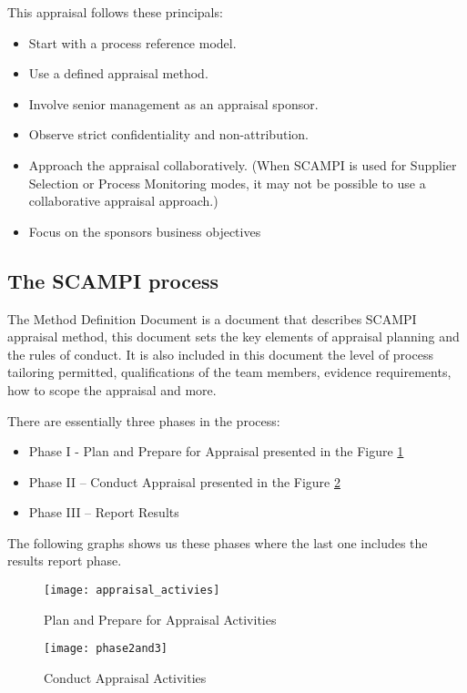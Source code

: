 This appraisal follows these principals:
\begin{itemize}
	\item Start with a process reference model.
	\item Use a defined appraisal method.
	\item Involve senior management as an appraisal sponsor.
	\item Observe strict confidentiality and non-attribution.
	\item Approach the appraisal collaboratively. (When SCAMPI is used for Supplier Selection or Process Monitoring modes, it may not be
	possible to use a collaborative appraisal approach.)
	\item Focus on the sponsors business objectives
\end{itemize}

\subsection{The SCAMPI process}

The Method Definition Document is a document that describes SCAMPI appraisal method, this document sets the key elements of appraisal planning and the rules of conduct. It is also included in this document the level of process tailoring permitted, qualifications of the team members, evidence requirements, how to scope the appraisal and more.

There are essentially three phases in the process:
\begin{itemize}
	\item Phase I - Plan and Prepare for Appraisal presented in the Figure \ref{fig:plan_appraisal}
	\item Phase II – Conduct Appraisal presented in the Figure \ref{fig:results_appraisal}
	\item Phase III – Report Results
\end{itemize}

The following graphs shows us these phases where the last one includes the results report phase.

\begin{figure}[h]
	\begin{center}
		\leavevmode
		\texttt{[image: appraisal\_activies]}
		\caption{Plan and Prepare for Appraisal Activities}
		\label{fig:plan_appraisal}
	\end{center}
\end{figure}


\begin{figure}[h]
	\begin{center}
		\leavevmode
		\texttt{[image: phase2and3]}
		\caption{Conduct Appraisal Activities}
		\label{fig:results_appraisal}
	\end{center}
\end{figure}

